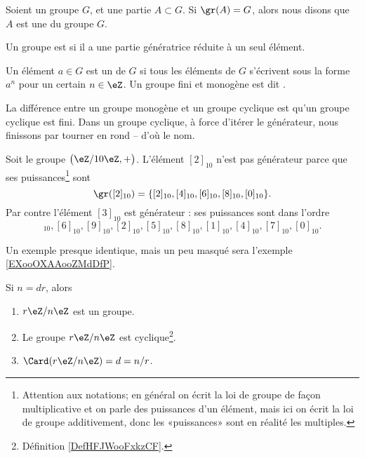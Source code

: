 \begin{definition}  \label{DEFooWMFVooLDqVxR}
	Soient un groupe \( G\), et une partie \( A\subset G\). Si \( \gr(A)=G\), alors nous disons que \( A\) est une  du groupe \( G\).

	Un groupe est  si il a une partie génératrice réduite à un seul élément.
\end{definition}

\begin{definition}     \label{DefHFJWooFxkzCF}
	Un élément \( a\in G\) est un  de \( G\) si tous les éléments de \( G\) s'écrivent sous la forme \( a^n\) pour un certain \( n\in\eZ\). Un groupe fini et monogène est dit .
\end{definition}

\begin{normaltext}
	La différence entre un groupe monogène et un groupe cyclique est qu'un groupe cyclique est fini. Dans un groupe cyclique, à force d'itérer le générateur, nous finissons par tourner en rond -- d'où le nom.
\end{normaltext}

\begin{example}
	Soit le groupe \( \big( \eZ/10\eZ,+ \big)\). L'élément \( [2]_{10}\) n'est pas générateur parce que ses puissances\footnote{Attention aux notations; en général on écrit la loi de groupe de façon multiplicative et on parle des puissances d'un élément, mais ici on écrit la loi de groupe additivement, donc les «puissances» sont en réalité les multiples.} sont
	\begin{equation}
		\gr([2]_{10})=\{ [2]_{10},[4]_{10},[6]_{10},[8]_{10},[0]_{10} \}.
	\end{equation}
	Par contre l'élément \( [3]_{10}\) est générateur : ses puissances sont dans l'ordre
	\begin{equation}
		[3]_{10}, [6]_{10}, [9]_{10}, [2]_{10}, [5]_{10}, [8]_{10},[1]_{10},[4]_{10},[7]_{10},[0]_{10}.
	\end{equation}
\end{example}

Un exemple presque identique, mais un peu masqué sera l'exemple \ref{EXooOXAAooZMdDfP}.


\begin{lemma}        \label{LEMooTHBIooJPjBlp}
	Si \( n=dr\), alors
	\begin{enumerate}
		\item
		      \( r\eZ/n\eZ\) est un groupe.
		\item   \label{LEMooSAAXooMezYui}
		      Le groupe \( r\eZ/n\eZ\) est cyclique\footnote{Définition \ref{DefHFJWooFxkzCF}.}.
		\item       \label{ITEMooGCGQooIfZULt}
		      \( \Card(r\eZ/n\eZ)=d=n/r\).
	\end{enumerate}
\end{lemma}


